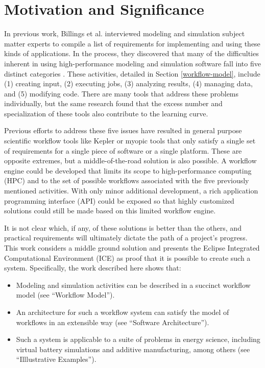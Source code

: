 \section{Motivation and Significance}\label{motivation-and-significance}

In previous work, Billings et al. interviewed modeling and simulation subject matter experts to compile a list of requirements for implementing and 
using these kinds of applications. In the process, they discovered 
that many of the difficulties inherent in using
high-performance modeling and simulation software fall into five
distinct categories \cite{billings_designing_2009}. These activities,
detailed in Section \ref{workflow-model}, include (1) creating input,
(2) executing jobs, (3) analyzing results, (4) managing data, and (5)
modifying code. There are many tools that address these problems
individually, but the same research found that the excess number and
specialization of these tools also contribute to the learning curve.

Previous efforts to address these five issues have resulted in general
purpose scientific workflow tools like Kepler \cite{ludascher_scientific_2006} 
or myopic tools that only satisfy a single
set of requirements for a single piece of software or a single platform. These
are opposite extremes, but a middle-of-the-road solution is also
possible. A workflow engine could be developed that limits its scope to
high-performance computing (HPC) and to the set of possible workflows
associated with the five previously mentioned activities. With only
minor additional development, a rich application programming interface
(API) could be exposed so that highly customized solutions could still
be made based on this limited workflow engine.

It is not clear which, if any, of these solutions is better than the
others, and practical requirements will ultimately dictate the path of a
project's progress. This work considers a middle ground solution and
presents the Eclipse Integrated Computational Environment (ICE) as proof
that it is possible to create such a system. Specifically, the work
described here shows that:

\begin{itemize}
\item
  Modeling and simulation activities can be described in a succinct
  workflow model (see ``Workflow Model'').
\item
  An architecture for such a workflow system can satisfy the model of
  workflows in an extensible way (see ``Software Architecture'').
\item
  Such a system is applicable to a suite of problems in energy science,
  including virtual battery simulations and additive manufacturing, 
  among others (see ``Illlustrative Examples'').
\end{itemize}

